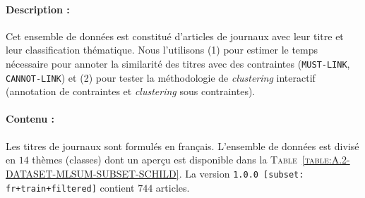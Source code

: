 		
		\paragraph{Description :}
		Cet ensemble de données est constitué d'articles de journaux avec leur titre et leur classification thématique.
		Nous l'utilisons (1) pour estimer le temps nécessaire pour annoter la similarité des titres avec des contraintes (\texttt{MUST-LINK}, \texttt{CANNOT-LINK}) et (2) pour tester la méthodologie de \textit{clustering} interactif (annotation de contraintes et \textit{clustering} sous contraintes).
		
		\paragraph{Contenu :}
		Les titres de journaux sont formulés en français.
		L'ensemble de données est divisé en $14$ thèmes (classes) dont un aperçu est disponible dans la \textsc{Table~\ref{table:A.2-DATASET-MLSUM-SUBSET-SCHILD}}.
		La version \texttt{1.0.0 [subset: fr+train+filtered]} contient $744$ articles.
		
		
		
